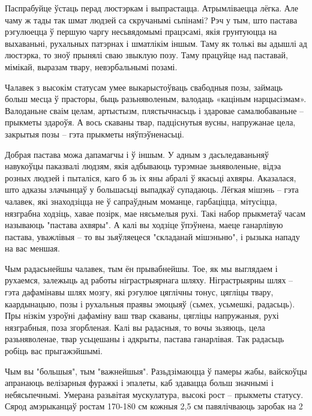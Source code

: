 Паспрабуйце ўстаць перад люстэркам і выпрастацца. Атрымліваецца лёгка. Але чаму ж тады так шмат людзей са скручанымі сьпінамі? Рэч у тым, што пастава рэгулюецца ў першую чаргу несьвядомымі працэсамі, якія грунтуюцца на выхаваньні, рухальных патэрнах і шматлікім іншым. Таму як толькі вы адышлі ад люстэрка, то зноў прынялі сваю звыклую позу. Таму працуйце над паставай, мімікай, выразам твару, невэрбальнымі позамі.

Чалавек з высокім статусам умее выкарыстоўваць свабодныя позы, займаць больш месца ў прасторы, быць разьняволеным, валодаць «каціным нарцысізмам». Валоданьне сваім целам, артыстызм, плястычнасьць і здаровае самалюбаваньне – прыкметы здароўя. А вось скаваны твар, падціснутыя вусны, напружанае цела, закрытыя позы – гэта прыкметы няўпэўненасьці.

Добрая пастава можа дапамагчы і ў іншым. У адным з дасьледаваньняў навукоўцы паказвалі людзям, якія адбываюць турэмнае зьняволеньне, відэа розных людзей і пыталіся, каго б зь іх яны абралі ў якасьці ахвяры. Аказалася, што адказы злачынцаў у большасьці выпадкаў супадаюць. Лёгкая мішэнь – гэта чалавек, які знаходзіцца не ў сапраўдным моманце, гарбаціцца, мітусіцца, нязграбна ходзіць, хавае позірк, мае нясьмелыя рухі. Такі набор прыкметаў часам называюць "пастава ахвяры". А калі вы ходзіце ўпэўнена, маеце ганарлівую пастава, уважлівыя – то вы зьяўляецеся "складанай мішэньню", і рызыка нападу на вас меншая.

Чым радасьнейшы чалавек, тым ён прывабнейшы. Тое, як мы выглядаем і рухаемся, залежыць ад работы ніграстрыярнага шляху. Ніграстрыярны шлях – гэта дафамінавы шлях мозгу, які рэгулюе цяглічны тонус, цягліцы твару, каардынацыю, позы і рухальныя праявы эмоцыяў (сьмех, усьмешкі, радасьць). Пры нізкім узроўні дафаміну ваш твар скаваны, цягліцы напружаныя, рухі нязграбныя, поза згорбленая. Калі вы радасныя, то вочы зьзяюць, цела разьняволенае, твар усьцешаны і адкрыты, пастава ганарлівая. Так радасьць робіць вас прыгажэйшымі.

Чым вы "большыя", тым "важнейшыя". Разьдзімаюцца ў памеры жабы, вайскоўцы апранаюць велізарныя фуражкі і эпалеты, каб здавацца больш значнымі і небясьпечнымі. Умерана разьвітая мускулатура, высокі рост – прыкметы статусу. Сярод амэрыканцаў ростам 170-180 см кожныя 2,5 см павялічваюць заробак на 2%

